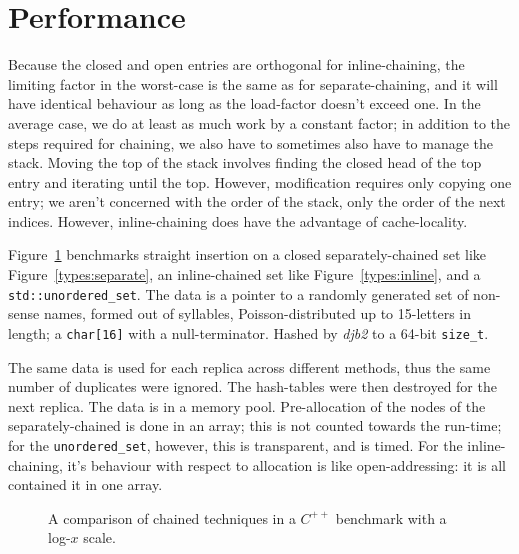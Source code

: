 \documentclass[12pt]{article}
\newcommand{\code}[1]{\colorbox{light-gray}{\texttt{#1}}}
\begin{document}
\section{Performance}

Because the closed and open entries are orthogonal for inline-chaining, the limiting factor in the worst-case is the same as for separate-chaining, and it will have identical behaviour as long as the load-factor doesn't exceed one. In the average case, we do at least as much work by a constant factor; in addition to the steps required for chaining, we also have to sometimes also have to manage the stack. Moving the top of the stack involves finding the closed head of the top entry and iterating until the top. However, modification requires only copying one entry; we aren't concerned with the order of the stack, only the order of the next indices. However, inline-chaining does have the advantage of cache-locality.

Figure~\ref{timing} benchmarks straight insertion on a closed separately-chained set like Figure~\ref{types:separate}, an inline-chained set like Figure~\ref{types:inline}, and a \code{std::unordered\_set}. The data is a pointer to a randomly generated set of non-sense names, formed out of syllables, Poisson-distributed up to 15-letters in length; a \code{char[16]} with a null-terminator. Hashed by {\it djb2} to a 64-bit \code{size\_t}.

The same data is used for each replica across different methods, thus the same number of duplicates were ignored. The hash-tables were then destroyed for the next replica. The data is in a memory pool. Pre-allocation of the nodes of the separately-chained is done in an array; this is not counted towards the run-time; for the \code{unordered\_set}, however, this is transparent, and is timed. For the inline-chaining, it's behaviour with respect to allocation is like open-addressing: it is all contained it in one array.

\begin{figure}%
\centering%
\caption{A comparison of chained techniques in a $C^{++}$ benchmark with a log-$x$ scale.}%
\label{timing}%
\end{figure}%
\end{document}
